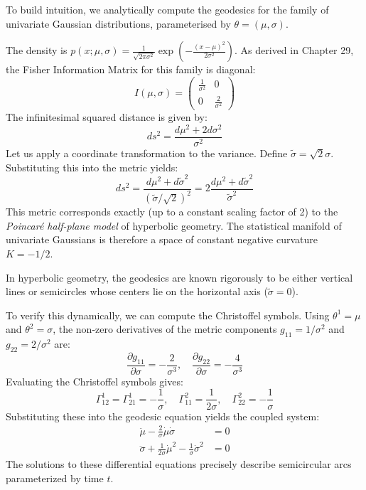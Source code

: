 To build intuition, we analytically compute the geodesics for the family of univariate Gaussian distributions, parameterised by $\theta = (\mu, \sigma)$. 

The density is $p(x; \mu, \sigma) = \frac{1}{\sqrt{2\pi\sigma^2}} \exp\left( -\frac{(x-\mu)^2}{2\sigma^2} \right)$. As derived in Chapter 29, the Fisher Information Matrix for this family is diagonal:
\begin{equation}
I(\mu, \sigma) = \begin{pmatrix} \frac{1}{\sigma^2} & 0 \\ 0 & \frac{2}{\sigma^2} \end{pmatrix}
\end{equation}
The infinitesimal squared distance is given by:
\begin{equation}
ds^2 = \frac{d\mu^2 + 2d\sigma^2}{\sigma^2}
\end{equation}
Let us apply a coordinate transformation to the variance. Define $\tilde{\sigma} = \sqrt{2}\sigma$. Substituting this into the metric yields:
\begin{equation}
ds^2 = \frac{d\mu^2 + d\tilde{\sigma}^2}{(\tilde{\sigma}/\sqrt{2})^2} = 2 \frac{d\mu^2 + d\tilde{\sigma}^2}{\tilde{\sigma}^2}
\end{equation}
This metric corresponds exactly (up to a constant scaling factor of 2) to the \textit{Poincaré half-plane model} of hyperbolic geometry. The statistical manifold of univariate Gaussians is therefore a space of constant negative curvature $K = -1/2$.

In hyperbolic geometry, the geodesics are known rigorously to be either vertical lines or semicircles whose centers lie on the horizontal axis ($\tilde{\sigma} = 0$).

To verify this dynamically, we can compute the Christoffel symbols. Using $\theta^1 = \mu$ and $\theta^2 = \sigma$, the non-zero derivatives of the metric components $g_{11} = 1/\sigma^2$ and $g_{22} = 2/\sigma^2$ are:
\begin{equation}
\frac{\partial g_{11}}{\partial \sigma} = -\frac{2}{\sigma^3}, \quad \frac{\partial g_{22}}{\partial \sigma} = -\frac{4}{\sigma^3}
\end{equation}
Evaluating the Christoffel symbols gives:
\begin{equation}
\Gamma^1_{12} = \Gamma^1_{21} = -\frac{1}{\sigma}, \quad \Gamma^2_{11} = \frac{1}{2\sigma}, \quad \Gamma^2_{22} = -\frac{1}{\sigma}
\end{equation}
Substituting these into the geodesic equation yields the coupled system:
\begin{align}
\ddot{\mu} - \frac{2}{\sigma} \dot{\mu} \dot{\sigma} &= 0 \\
\ddot{\sigma} + \frac{1}{2\sigma} \dot{\mu}^2 - \frac{1}{\sigma} \dot{\sigma}^2 &= 0
\end{align}
The solutions to these differential equations precisely describe semicircular arcs parameterized by time $t$. 

